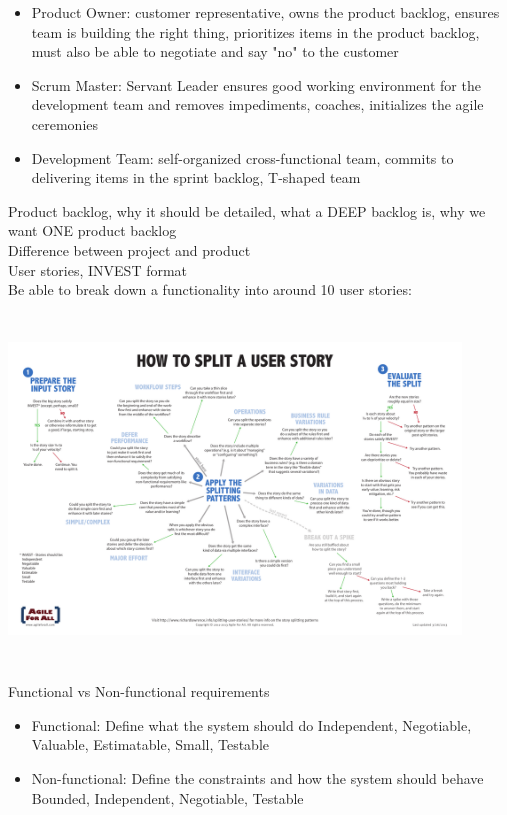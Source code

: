 \documentclass[10pt]{article}
\begin{document}
\begin{itemize}
\item Product Owner: customer representative, owns the product backlog, ensures team is building the right thing, prioritizes items in the product backlog, must also be able to negotiate and say "no" to the customer
\item Scrum Master: Servant Leader ensures good working environment for the development team and removes impediments, coaches, initializes the agile ceremonies
\item Development Team: self-organized cross-functional team, commits to delivering items in the sprint backlog, T-shaped team
\end{itemize}
Product backlog, why it should be detailed, what a DEEP backlog is, why we want ONE product backlog\\
Difference between project and product\\
User stories, INVEST format\\
Be able to break down a functionality into around 10 user stories:\\
\includegraphics[width=12cm, height=10cm]{userstories-flowchart}\\
Functional vs Non-functional requirements
\begin{itemize}
\item Functional:
Define what the system should do
Independent, Negotiable, Valuable, Estimatable, Small, Testable
\item Non-functional:
Define the constraints and how the system should behave
Bounded, Independent, Negotiable, Testable
\end{itemize}
\end{document}
